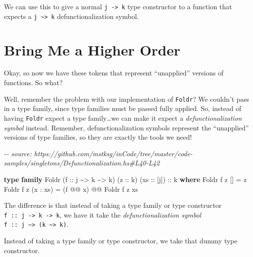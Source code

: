 \documentclass[]{article}
\newenvironment{Shaded}{}{}
\newcommand{\CommentTok}[1]{\textcolor[rgb]{0.38,0.63,0.69}{\textit{#1}}}
\newcommand{\DataTypeTok}[1]{\textcolor[rgb]{0.56,0.13,0.00}{#1}}
\newcommand{\KeywordTok}[1]{\textcolor[rgb]{0.00,0.44,0.13}{\textbf{#1}}}
\newcommand{\NormalTok}[1]{#1}
\newcommand{\OperatorTok}[1]{\textcolor[rgb]{0.40,0.40,0.40}{#1}}
\newcommand{\OtherTok}[1]{\textcolor[rgb]{0.00,0.44,0.13}{#1}}
\begin{document}
We can use this to give a normal \texttt{j\ -\textgreater{}\ k} type constructor
to a function that expects a \texttt{j\ \textasciitilde{}\textgreater{}\ k}
defunctionalization symbol.

\section{Bring Me a Higher Order}\label{bring-me-a-higher-order}

Okay, so now we have these tokens that represent ``unapplied'' versions of
functions. So what?

Well, remember the problem with our implementation of \texttt{Foldr}? We
couldn't pass in a type family, since type families must be passed fully
applied. So, instead of having \texttt{Foldr} expect a type family\ldots we can
make it expect a \emph{defunctionalization symbol} instead. Remember,
defunctionalization symbols represent the ``unapplied'' versions of type
families, so they are exactly the tools we need!

\begin{Shaded}
\begin{Highlighting}[]
\CommentTok{{-}{-} source: https://github.com/mstksg/inCode/tree/master/code{-}samples/singletons/Defunctionalization.hs\#L40{-}L42}

\KeywordTok{type} \KeywordTok{family} \DataTypeTok{Foldr}\NormalTok{ (}\OtherTok{f ::}\NormalTok{ j }\OperatorTok{\textasciitilde{}\textgreater{}}\NormalTok{ k }\OperatorTok{\textasciitilde{}\textgreater{}}\NormalTok{ k) (}\OtherTok{z ::}\NormalTok{ k) (}\OtherTok{xs ::}\NormalTok{ [j])}\OtherTok{ ::}\NormalTok{ k }\KeywordTok{where}
    \DataTypeTok{Foldr}\NormalTok{ f z \textquotesingle{}[]       }\OtherTok{=}\NormalTok{ z}
    \DataTypeTok{Foldr}\NormalTok{ f z (x \textquotesingle{}}\OperatorTok{:}\NormalTok{ xs) }\OtherTok{=}\NormalTok{ (f }\OperatorTok{@@}\NormalTok{ x) }\OperatorTok{@@} \DataTypeTok{Foldr}\NormalTok{ f z xs}
\end{Highlighting}
\end{Shaded}

The difference is that instead of taking a type family or type constructor
\texttt{f\ ::\ j\ -\textgreater{}\ k\ -\textgreater{}\ k}, we have it take the
\emph{defunctionalization symbol}
\texttt{f\ ::\ j\ \textasciitilde{}\textgreater{}\ (k\ \textasciitilde{}\textgreater{}\ k)}.

Instead of taking a type family or type constructor, we take that dummy type
constructor.
\end{document}
